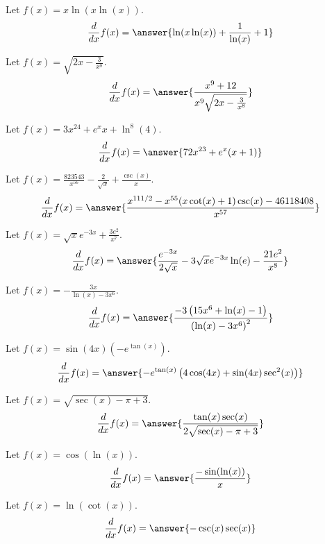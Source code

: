 \documentclass{ximera}
\begin{document}
\begin{shuffle}
\begin{exercise}
Let $f(x)=x \ln (x \ln (x))$.
\[
\ddx f(x) = \answer{\ln (x \ln (x))+\frac{1}{\ln (x)}+1}
\]
\end{exercise}

\begin{exercise}
Let $f(x)=\sqrt{2 x-\frac{3}{x^8}}$.
\[
\ddx f(x) = \answer{\frac{x^9+12}{x^9 \sqrt{2 x-\frac{3}{x^8}}}}
\]
\end{exercise}

\begin{exercise}
Let $f(x)=3 x^{24}+e^x x+\ln ^8(4)$.
\[
\ddx f(x) = \answer{72 x^{23}+e^x (x+1)}
\]
\end{exercise}

\begin{exercise}
Let $f(x)=\frac{823543}{x^{56}}-\frac{2}{\sqrt{x}}+\frac{\csc (x)}{x}$.
\[
\ddx f(x) = \answer{\frac{x^{111/2}-x^{55} (x \cot (x)+1) \csc (x)-46118408}{x^{57}}}
\]
\end{exercise}

\begin{exercise}
Let $f(x)=\sqrt{x} e^{-3 x}+\frac{3 e^2}{x^7}$.
\[
\ddx f(x) = \answer{\frac{e^{-3 x}}{2 \sqrt{x}}-3 \sqrt{x} e^{-3 x} \ln (e)-\frac{21 e^2}{x^8}}
\]
\end{exercise}

\begin{exercise}
Let $f(x)=-\frac{3 x}{\ln (x)-3 x^6}$.
\[
\ddx f(x) = \answer{\frac{-3 \left(15 x^6+\ln (x)-1\right)}{\left(\ln (x)-3 x^6\right)^2}}
\]
\end{exercise}

\begin{exercise}
Let $f(x)=\sin (4 x) \left(-e^{\tan (x)}\right)$.
\[
\ddx f(x) = \answer{-e^{\tan (x)} \left(4 \cos (4 x)+\sin (4 x) \sec ^2(x)\right)}
\]
\end{exercise}

\begin{exercise}
Let $f(x)=\sqrt{\sec (x)-\pi +3}$.
\[
\ddx f(x) = \answer{\frac{\tan (x) \sec (x)}{2 \sqrt{\sec (x)-\pi +3}}}
\]
\end{exercise}

\begin{exercise}
Let $f(x)=\cos (\ln (x))$.
\[
\ddx f(x) = \answer{\frac{-\sin (\ln (x))}{x}}
\]
\end{exercise}

\begin{exercise}
Let $f(x)=\ln (\cot (x))$.
\[
\ddx f(x) = \answer{-\csc (x) \sec (x)}
\]
\end{exercise}


\end{shuffle}
\end{document}

